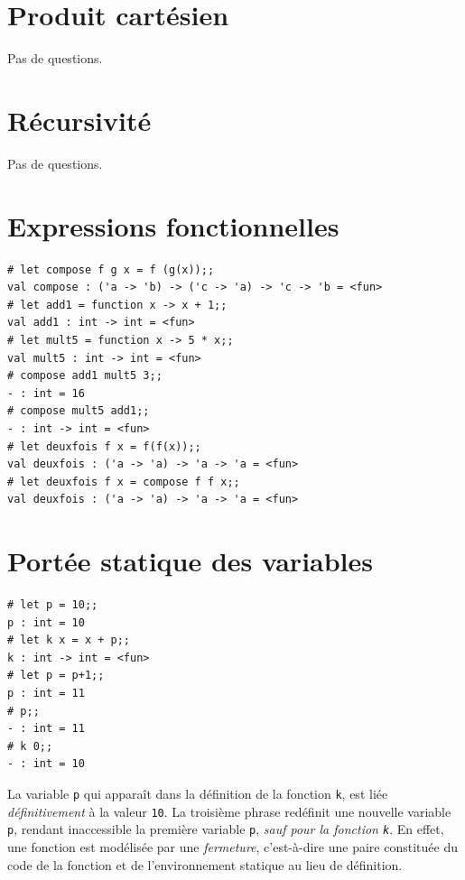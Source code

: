 \documentclass[11pt, a4paper]{article}
\begin{document}
\section{Produit cartésien}

Pas de questions.

\section{Récursivité}

Pas de questions.

\section{Expressions fonctionnelles}

\begin{verbatim}
# let compose f g x = f (g(x));;
val compose : ('a -> 'b) -> ('c -> 'a) -> 'c -> 'b = <fun>
# let add1 = function x -> x + 1;;
val add1 : int -> int = <fun>
# let mult5 = function x -> 5 * x;;
val mult5 : int -> int = <fun>
# compose add1 mult5 3;;
- : int = 16
# compose mult5 add1;;
- : int -> int = <fun>
# let deuxfois f x = f(f(x));;
val deuxfois : ('a -> 'a) -> 'a -> 'a = <fun>
# let deuxfois f x = compose f f x;;
val deuxfois : ('a -> 'a) -> 'a -> 'a = <fun>
\end{verbatim}

\section{Portée statique des variables}

\begin{verbatim}
# let p = 10;;
p : int = 10
# let k x = x + p;;
k : int -> int = <fun>
# let p = p+1;;
p : int = 11
# p;;
- : int = 11
# k 0;;
- : int = 10
\end{verbatim}

La variable \texttt{p} qui apparaît dans la définition de la fonction
\texttt{k}, est liée \emph{définitivement} à la valeur \texttt{10}. La
troisième phrase redéfinit une nouvelle variable \texttt{p}, rendant
inaccessible la première variable \texttt{p}, \emph{sauf pour la
fonction \texttt{k}}. En effet, une fonction est modélisée par une
\emph{fermeture}, c'est-à-dire une paire constituée du code de la
fonction et de l'environnement statique au lieu de définition.
\end{document}
